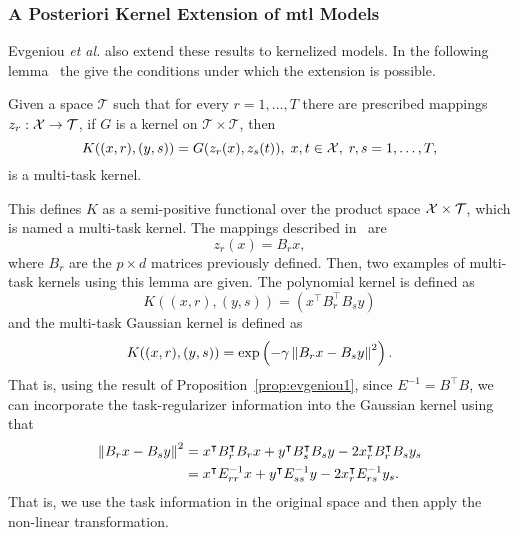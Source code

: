 \subsubsection*{A Posteriori Kernel Extension of \acrshort{mtl} Models}
Evgeniou \emph{et al.} also extend these results to kernelized models. In the following lemma~\cite[Lemma 2]{EvgeniouMP05} the give the conditions under which the extension is possible.

\begin{lemma}\label{lemma:evgeniou_2}
    Given a space $\mathcal{T}$ such that for every $r=1, \ldots, T$  there are prescribed mappings
    $z_r: \mathcal{X} \to \mathcal{T}$, if $G$ is a kernel on $\mathcal{T} \times \mathcal{T}$, then 
    \begin{equation}
        \label{eq:evgeniou_lemma2}
        K((x, r), (y, s)) = G(z_r(x), z_s(t)),\; x, t \in \Xspace,\; r,s = 1, \ldots, \ntasks ,
    \end{equation}
    is a multi-task kernel.
\end{lemma}
This defines $K$ as a semi-positive functional over the product space $\mathcal{X} \times \mathcal{T}$, which is named a multi-task kernel.
The mappings described in~\cite{EvgeniouMP05} are
$$ z_r(x) = B_r x ,$$
where $B_r$ are the $p \times d$ matrices previously defined.
Then, two examples of multi-task kernels using this lemma are given. The polynomial kernel is defined as
$$ K((x, r), (y, s)) = \left( x^\intercal B_r^\intercal B_s y\right) $$
and the multi-task Gaussian kernel is defined as
$$ K((x, r), (y, s)) = \exp\left(-\gamma \left\lVert B_r x - B_s y\right\rVert^2 \right) .$$
That is, using the result of Proposition~\ref{prop:evgeniou1}, since $E^{-1} = B^\intercal B$, we can incorporate the task-regularizer information into the Gaussian kernel using that
\begin{align*}
    \left\lVert B_r x - B_s y\right\rVert^2 
    &= x^\intercal B_r^\intercal B_r x + y^\intercal B_s^\intercal B_s y - 2 x_r^\intercal B_r^\intercal B_s y_s \\
    &= x^\intercal E_{rr}^{-1} x + y^\intercal E_{ss}^{-1} y - 2 x_r^\intercal E_{rs}^{-1} y_s .
\end{align*}
That is, we use the task information in the original space and then apply the non-linear transformation.
%

